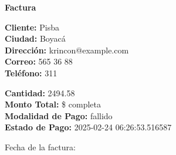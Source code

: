 \documentclass{article}
\begin{document}
\begin{center}
    {\LARGE \textbf{Factura}}\\[1cm]
\end{center}

\textbf{Cliente:} Pisba \\
\textbf{Ciudad:} Boyacá \\
\textbf{Dirección:} krincon@example.com \\
\textbf{Correo:} 565 36 88 \\
\textbf{Teléfono:} 311 \\

\vspace{0.5cm}

\textbf{Cantidad:} 2494.58 \\
\textbf{Monto Total:} \$ completa \\
\textbf{Modalidad de Pago:} fallido \\
\textbf{Estado de Pago:} 2025-02-24 06:26:53.516587 \\

\vspace{1cm}

Fecha de la factura: 
\end{document}
